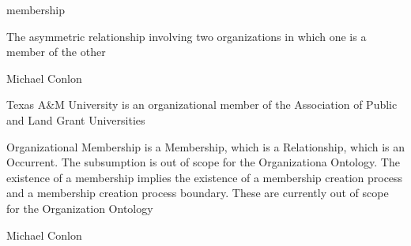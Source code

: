 \documentclass[letterpaper,10pt,english]{sphinxmanual}
\begin{document}
\begin{sphinxShadowBox}

\sphinxAtStartPar
membership
\end{sphinxShadowBox}

\begin{sphinxShadowBox}

\sphinxAtStartPar
{\hyperref[\detokenize{doc-BFO_0000003::doc}]{}}
\end{sphinxShadowBox}

\begin{sphinxShadowBox}

\sphinxAtStartPar
The asymmetric relationship involving two organizations in which one is a member of the other
\end{sphinxShadowBox}

\begin{sphinxShadowBox}

\sphinxAtStartPar
Michael Conlon 
\end{sphinxShadowBox}

\begin{sphinxShadowBox}

\sphinxAtStartPar
Texas A\&M University is an organizational member of the Association of Public and Land Grant Universities
\end{sphinxShadowBox}

\begin{sphinxShadowBox}

\sphinxAtStartPar
Organizational Membership is a Membership, which is a Relationship, which is an Occurrent.  The subsumption is out of scope for the Organizationa Ontology. The existence of a membership implies the existence of a membership creation process and a membership creation process boundary.  These are currently out of scope for the Organization Ontology
\end{sphinxShadowBox}

\begin{sphinxShadowBox}

\sphinxAtStartPar
Michael Conlon 
\end{sphinxShadowBox}
\begin{quote}

\ignorespaces \end{quote}
\end{document}
